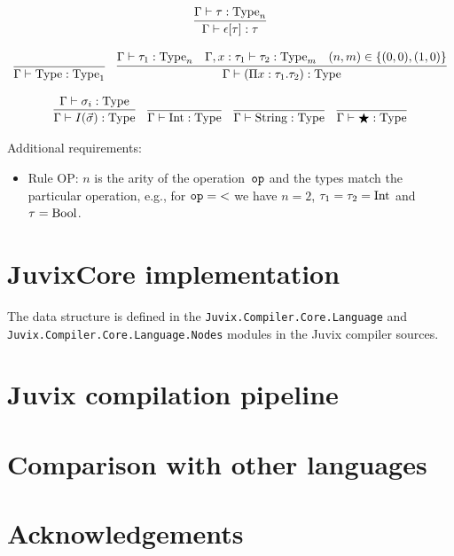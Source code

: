 \documentclass[final]{msc}
\begin{document}
\[\begin{array}{c}
\\ \\
\infer{\Gamma \proves \epsilon[\tau] : \tau}{\Gamma \proves \tau : \Type_n}
\\ \\
\infer{\Gamma \proves \Type : \Type_1}{}\quad
\infer{\Gamma \proves (\Pi x : \tau_1 . \tau_2) : \Type}{\Gamma \proves \tau_1 : \Type_n & \Gamma, x : \tau_1 \proves \tau_2 : \Type_m & (n,m) \in \{(0,0), (1,0)\}}
\\ \\
\infer{\Gamma \proves I(\vec{\sigma}) : \Type}{\Gamma \proves \sigma_i : \Type}\quad
\infer{\Gamma \proves \Int : \Type}{}\quad
\infer{\Gamma \proves \String : \Type}{}\quad
\infer{\Gamma \proves \Dynamic : \Type}{}
\end{array}
\]

Additional requirements:
\begin{itemize}
\item Rule OP: $n$ is the arity of the operation~$\mathtt{op}$ and the types match the particular operation, e.g., for $\mathtt{op} = {<}$ we have $n=2$, $\tau_1=\tau_2=\mathrm{Int}$ and $\tau=\mathrm{Bool}$.
\end{itemize}

\section{JuvixCore implementation}\label{sec_core_implementation}

The \JuvixCore{} data structure is defined in the \texttt{Juvix.Compiler.Core.Language} and \texttt{Juvix.Compiler.Core.Language.Nodes} modules in the Juvix compiler sources. 

\section{Juvix compilation pipeline}\label{sec_pipeline}

\section{Comparison with other languages}\label{sec_comparison}



\section*{Acknowledgements}
\nocite{*}

\end{document}
